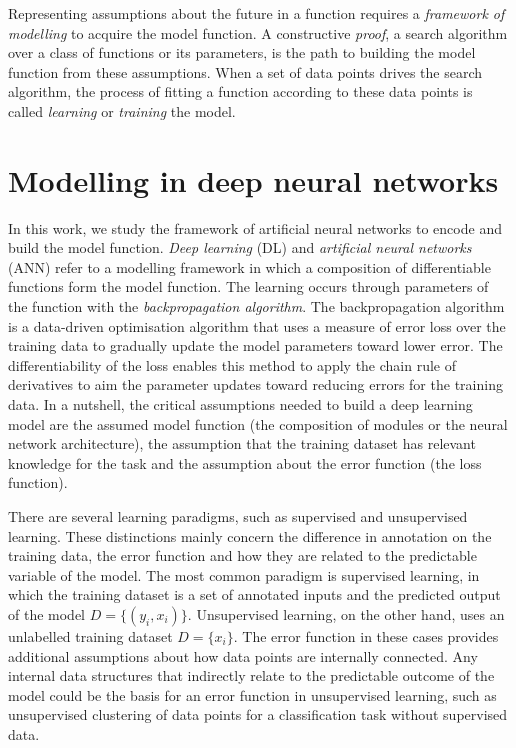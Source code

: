Representing assumptions about the future in a function requires a \emph{framework of modelling} to acquire the model function. 
A constructive \emph{proof}, a search algorithm over a class of functions or its parameters, is the path to building the model function from these assumptions.
When a set of data points drives the search algorithm, the process of fitting a function according to these data points is called \emph{learning} or \emph{training} the model.


\section{Modelling in deep neural networks}
\label{sec:concepts:dl}
In this work, we study the framework of artificial neural networks to encode and build the model function. 
\emph{Deep learning} (DL) and \emph{artificial neural networks} (ANN)
refer to a modelling framework in which a composition of differentiable functions form the model function.
The learning occurs through parameters of the function with the \emph{backpropagation algorithm}.
The backpropagation algorithm is a data-driven optimisation algorithm that uses a measure of error loss over the training data to gradually update the model parameters toward lower error. 
The differentiability of the loss enables this method to apply the chain rule of derivatives to aim the parameter updates toward reducing errors for the training data. 
In a nutshell, the critical assumptions needed to build a deep learning model are the assumed model function (the composition of modules or the neural network architecture), the assumption that the training dataset has relevant knowledge for the task and the assumption about the error function (the loss function).

There are several learning paradigms, such as supervised and unsupervised learning.
These distinctions mainly concern the difference in annotation on the training data, the error function and how they are related to the predictable variable of the model.
The most common paradigm is supervised learning, in which the training dataset is a set of annotated inputs and the predicted output of the model $D = \{(y_i, x_i)\}$.
Unsupervised learning, on the other hand, uses an unlabelled training dataset $D = \{x_i\}$.
The error function in these cases provides additional assumptions about how data points are internally connected. Any internal data structures that indirectly relate to the predictable outcome of the model could be the basis for an error function in unsupervised learning, such as unsupervised clustering of data points for a classification task without supervised data.

